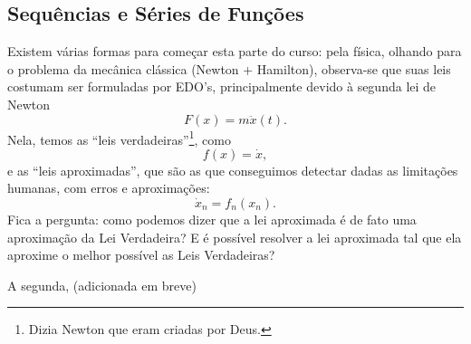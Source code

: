 \documentclass[../analysisII_notes.tex]{subfiles}
\begin{document}
\subsection{Sequências e Séries de Funções}
Existem várias formas para começar esta parte do curso: pela física, olhando para o problema da mecânica clássica (Newton + Hamilton), observa-se que suas leis costumam ser formuladas por EDO's, principalmente devido à segunda lei de Newton
\[
	F(x) = m \ddot{x}(t).
\]
Nela, temos as ``leis verdadeiras''\footnote{Dizia Newton que eram criadas por Deus.}, como
\[
	f(x) = \dot{x},
\]
e as ``leis aproximadas'', que são as que conseguimos detectar dadas as limitações humanas, com erros e aproximações:
\[
	\dot{x}_{n} = f_{n}(x_{n}).
\]
Fica a pergunta: como podemos dizer que a lei aproximada é de fato uma aproximação da Lei Verdadeira? E é possível resolver a lei aproximada tal que ela aproxime o melhor possível as Leis Verdadeiras?

A segunda, (adicionada em breve)
\end{document}
